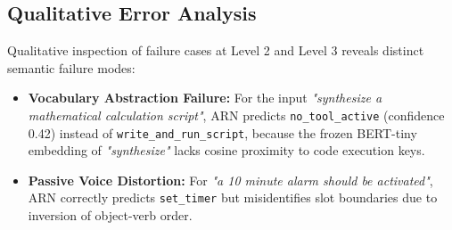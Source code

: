 \documentclass[letterpaper]{article} %
\begin{document}
\begin{table}[t]
\centering
\small
{}
\caption{Per-Tool Zero-Shot OOD Breakdown for a representative subset of 6 key tools out of 16 registered APIs ($n$ indicates evaluation sample size per tool; $\dagger$ indicates low-support anecdotal probes. Total probes across all 16 tools sum to $N=50$ per level, $N=200$ total).}
\label{tab:per_tool}
\end{table}

\subsection{Qualitative Error Analysis}
Qualitative inspection of failure cases at Level 2 and Level 3 reveals distinct semantic failure modes:
\begin{itemize}
    \item \textbf{Vocabulary Abstraction Failure:} For the input \emph{"synthesize a mathematical calculation script"}, ARN predicts \texttt{no\_tool\_active} (confidence 0.42) instead of \texttt{write\_and\_run\_script}, because the frozen BERT-tiny embedding of \emph{"synthesize"} lacks cosine proximity to code execution keys.
    \item \textbf{Passive Voice Distortion:} For \emph{"a 10 minute alarm should be activated"}, ARN correctly predicts \texttt{set\_timer} but misidentifies slot boundaries due to inversion of object-verb order.
\end{itemize}
\end{document}
